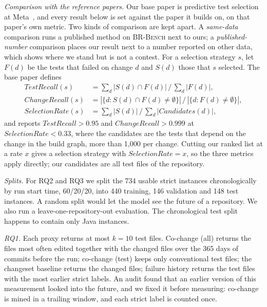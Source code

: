 \documentclass[10pt,conference]{IEEEtran}
\newcommand{\brb}{\textsc{BR-Bench}}
\begin{document}
\textit{Comparison with the reference papers.} Our base paper is predictive test selection at Meta~\cite{machalica2019predictive}, and every result below is set against the paper it builds on, on that paper's own metric. Two kinds of comparison are kept apart. A \emph{same-data} comparison runs a published method on \brb{} next to ours; a \emph{published-number} comparison places our result next to a number reported on other data, which shows where we stand but is not a contest. For a selection strategy $s$, let $F(d)$ be the tests that failed on change $d$ and $S(d)$ those that $s$ selected. The base paper defines
{\small
\begin{align}
\mathit{TestRecall}(s) &= \textstyle\sum_d |S(d)\cap F(d)| \,/\, \sum_d |F(d)|, \\
\mathit{ChangeRecall}(s) &= |\{d : S(d)\cap F(d)\neq\emptyset\}| \,/\, |\{d : F(d)\neq\emptyset\}|, \\
\mathit{SelectionRate}(s) &= \textstyle\sum_d |S(d)| \,/\, \sum_d |\mathit{Candidates}(d)|,
\end{align}
}
and reports $\mathit{TestRecall}>0.95$ and $\mathit{ChangeRecall}>0.999$ at $\mathit{SelectionRate}<0.33$, where the candidates are the tests that depend on the change in the build graph, more than 1,000 per change. Cutting our ranked list at a rate $x$ gives a selection strategy with $\mathit{SelectionRate}=x$, so the three metrics apply directly; our candidates are all test files of the repository.

\textit{Splits.} For RQ2 and RQ3 we split the 734 usable strict instances chronologically by run start time, 60/20/20, into 440 training, 146 validation and 148 test instances. A random split would let the model see the future of a repository. We also run a leave-one-repository-out evaluation. The chronological test split happens to contain only Java instances.

\textit{RQ1.} Each proxy returns at most $k=10$ test files. Co-change (all) returns the files most often edited together with the changed files over the 365 days of commits before the run; co-change (test) keeps only conventional test files; the changeset baseline returns the changed files; failure history returns the test files with the most earlier strict labels. An audit found that an earlier version of this measurement looked into the future, and we fixed it before measuring: co-change is mined in a trailing window, and each strict label is counted once.
\end{document}
